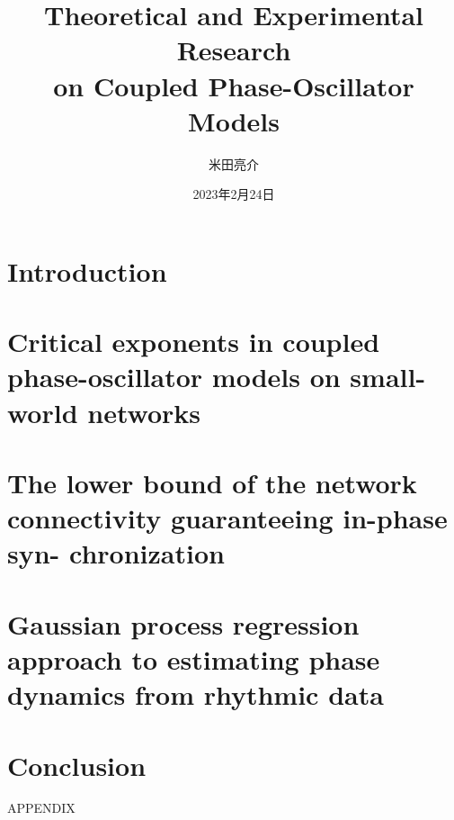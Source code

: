 \documentclass[serif,dvipdfmx,10pt]{beamer}
\title[Coupled Phase-Oscillator Models]{Theoretical and Experimental Research\\on Coupled Phase-Oscillator Models}
\author{米田亮介}
\date{2023年2月24日}
\institute[京大]{京都大学大学院情報学研究科先端数理科学専攻}
\begin{document}
\begin{frame}
  \titlepage
\end{frame}

\section{Introduction}



\section{Critical exponents in coupled phase-oscillator models on small-world networks}



\section{The lower bound of the network connectivity guaranteeing in-phase syn- chronization}



\section{Gaussian process regression approach to estimating phase dynamics from rhythmic data}


\section{Conclusion}


\appendix

\begin{frame}
    \centerline{\LARGE{APPENDIX}}
\end{frame}


\end{document}
